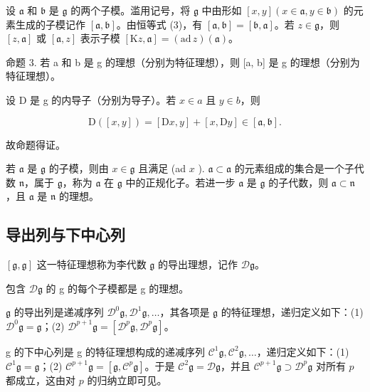 设 \(\mathfrak{a}\) 和 \(\mathfrak{b}\) 是 \(\mathfrak{g}\) 的两个子模。滥用记号，将 \(\mathfrak{g}\) 中由形如 \([x,y](x\in\mathfrak{a},y\in\mathfrak{b})\) 的元素生成的子模记作 \([\mathfrak{a},\mathfrak{b}]\)。由恒等式 (3)，有 \([\mathfrak{a},\mathfrak{b}] = [\mathfrak{b},\mathfrak{a}]\)。若 \(z\in\mathfrak{g}\)，则 \([z,\mathfrak{a}]\) 或 \([\mathfrak{a},z]\) 表示子模 \([\mathrm{K}z,\mathfrak{a}] = (\mathrm{ad}\,z)(\mathfrak{a})\)。

命题 3. 若 a 和 b 是 g 的理想（分别为特征理想），则 {[}a, b{]} 是 g 的理想（分别为特征理想）。

设 D 是 g 的内导子（分别为导子）。若 \(x \in a\) 且 \(y \in b\)，则

\[
\mathrm{D} ([ x, y ]) = [ \mathrm{D} x, y ] + [ x, \mathrm{D} y ] \in [ \mathfrak {a}, \mathfrak {b} ].
\]

故命题得证。

若 \(\mathfrak{a}\) 是 \(\mathfrak{g}\) 的子模，则由 \(x \in \mathfrak{g}\) 且满足 (ad \(x\) ). \(\mathfrak{a} \subset \mathfrak{a}\) 的元素组成的集合是一个子代数 \(\mathfrak{n}\)，属于 \(\mathfrak{g}\)，称为 \(\mathfrak{a}\) 在 \(\mathfrak{g}\) 中的正规化子。若进一步 \(\mathfrak{a}\) 是 \(\mathfrak{g}\) 的子代数，则 \(\mathfrak{a} \subset \mathfrak{n}\)，且 \(\mathfrak{a}\) 是 \(\mathfrak{n}\) 的理想。

\subsection{导出列与下中心列}

\([\mathfrak{g},\mathfrak{g}]\) 这一特征理想称为李代数 \(\mathfrak{g}\) 的导出理想，记作 \(\mathcal{D}\mathfrak{g}\)。

包含 \(\mathcal{D}\mathfrak{g}\) 的 g 的每个子模都是 g 的理想。

\(\mathfrak{g}\) 的导出列是递减序列 \(\mathcal{D}^0\mathfrak{g},\mathcal{D}^1\mathfrak{g},\ldots\)，其各项是 \(\mathfrak{g}\) 的特征理想，递归定义如下：(1) \(\mathcal{D}^0\mathfrak{g} = \mathfrak{g}\)；(2) \(\mathcal{D}^{p + 1}\mathfrak{g} = [\mathcal{D}^p\mathfrak{g},\mathcal{D}^p\mathfrak{g}]\)。

g 的下中心列是 g 的特征理想构成的递减序列 \(\mathcal{C}^1\mathfrak{g},\mathcal{C}^2\mathfrak{g},\ldots\)，递归定义如下：(1) \(\mathcal{C}^1\mathfrak{g} = \mathfrak{g}\)；(2) \(\mathcal{C}^{p + 1}\mathfrak{g} = [\mathfrak{g},\mathcal{C}^p\mathfrak{g}]\)。于是 \(\mathcal{C}^2\mathfrak{g} = \mathcal{D}\mathfrak{g}\)，并且 \(\mathcal{C}^{p + 1}\mathfrak{g}\supset \mathcal{D}^{p}\mathfrak{g}\) 对所有 \(p\) 都成立，这由对 \(p\) 的归纳立即可见。

